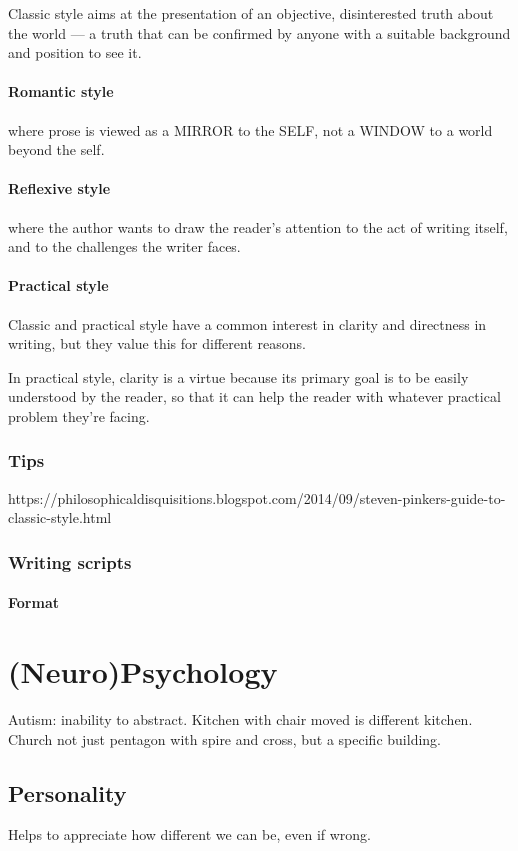 \documentclass{report}
\begin{document}
Classic style aims at the presentation of an objective, disinterested truth about the world — a truth that can be confirmed by anyone with a suitable background and position to see it. 
\subsection{Romantic style}
where prose is viewed as a MIRROR to the SELF, not a WINDOW to a world beyond the self.
\subsection{Reflexive style}
where the author wants to draw the reader’s attention to the act of writing itself, and to the challenges the writer faces.
\subsection{Practical style}
Classic and practical style have a common interest in clarity and directness in writing, but they value this for different reasons.

In practical style, clarity is a virtue because its primary goal is to be easily understood by the reader, so that it can help the reader with whatever practical problem they’re facing. 
\section{Tips}
https://philosophicaldisquisitions.blogspot.com/2014/09/steven-pinkers-guide-to-classic-style.html
\section{Writing scripts}
\subsection{Format}

\part{(Neuro)Psychology}
\setcounter{chapter}{0} %
Autism: inability to abstract. Kitchen with chair moved is different kitchen. Church not just pentagon with spire and cross, but a specific building.
\chapter{Personality}
Helps to appreciate how different we can be, even if wrong. 
\end{document}
